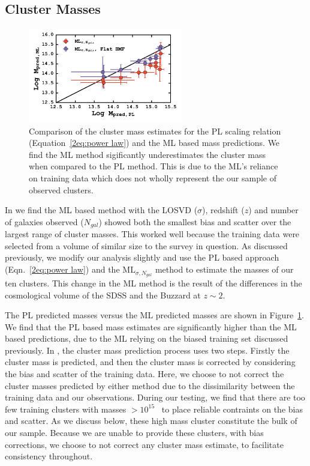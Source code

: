 \subsection{Cluster Masses}
\begin{figure} 
	\begin{center}
		\includegraphics[width=0.6\textwidth]{figures2/massCompare.pdf} 
	\end{center}
	\caption[PL estimated cluster versus ML predicted cluster mass]{Comparison of the cluster mass estimates for the PL scaling relation (Equation~\ref{2eq:power law}) and the ML based mass predictions. We find the ML method sigificantly underestimates the cluster mass when compared to the PL method. This is due to the ML's reliance on training data which does not wholly represent the our sample of observed clusters.}
 \label{2fig: ML comparison} 
\end{figure}

In  we find the ML based method with the LOSVD ($\sigma$), redshift ($z$) and number of galaxies observed ($N_{gal}$) showed both the smallest bias and scatter over the largest range of cluster masses. This worked well because the training data were selected from a volume of similar size to the survey in question. As discussed previously, we modify our analysis slightly and use the PL based approach (Eqn.~\ref{2eq:power law}) and the $\mathrm{ML}_{\sigma, N_{gal}}$ method to estimate the masses of our ten clusters. This change in the ML method is the result of the differences in the cosmological volume of the SDSS and the Buzzard at $z\sim2$.  

The PL predicted masses versus the ML predicted masses are shown in Figure~\ref{2fig: ML comparison}. We find that the PL based mass estimates are significantly higher than the ML based predictions, due to the ML relying on the biased training set discussed previously. In , the cluster mass prediction process uses two steps. Firstly the cluster mass is predicted, and then the cluster mass is corrected by considering the bias and scatter of the training data. Here, we choose to not correct the cluster masses predicted by either method due to the dissimilarity between the training data and our observations. During our testing, we find that there are too few training clusters with masses $> 10^{15}$ \Msol\ to place reliable contraints on the bias and scatter. As we discuss below, these high mass cluster constitute the bulk of our sample. Because we are unable to provide these clusters, with bias corrections, we choose to not correct any cluster mass estimate, to facilitate consistency throughout. 


